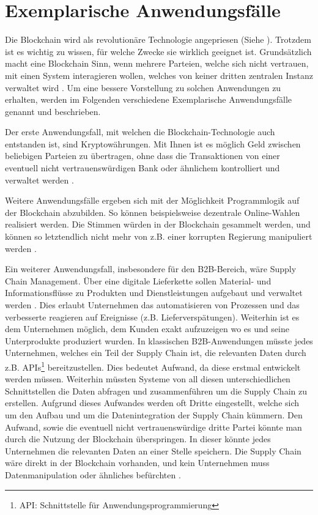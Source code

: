 \section{Exemplarische Anwendungsfälle}
\label{subsec:use-cases}
Die Blockchain wird als revolutionäre Technologie angepriesen (Siehe \cite{TapscottBlockchainRevolutionWieTechnologie2016}). Trotzdem ist es wichtig zu wissen, für welche Zwecke sie wirklich geeignet ist. Grundsätzlich macht eine Blockchain Sinn, wenn mehrere Parteien, welche sich nicht vertrauen, mit einen System interagieren wollen, welches von keiner dritten zentralen Instanz verwaltet wird \cite{WustyouneedBlockchain2017}. Um eine bessere Vorstellung zu solchen Anwendungen zu erhalten, werden im Folgenden verschiedene Exemplarische Anwendungsfälle genannt und beschrieben.

Der erste Anwendungsfall, mit welchen die Blockchain-Technologie auch entstanden ist, sind Kryptowährungen. Mit Ihnen ist es möglich Geld zwischen beliebigen Parteien zu übertragen, ohne dass die Transaktionen von einer eventuell nicht vertrauenswürdigen Bank oder ähnlichem kontrolliert und verwaltet werden \cite{SwanBlockchainblueprintnew2015}.

Weitere Anwendungsfälle ergeben sich mit der Möglichkeit Programmlogik auf der Blockchain abzubilden. So können beispielsweise dezentrale Online-Wahlen realisiert werden. Die Stimmen würden in der Blockchain gesammelt werden, und können so letztendlich nicht mehr von z.B. einer korrupten Regierung manipuliert werden \cite{CastorEthereumVotingScheme2017}. 

Ein weiterer Anwendungsfall, insbesondere für den B2B-Bereich, wäre Supply Chain Management. Über eine digitale Lieferkette sollen Material- und Informationsflüsse zu Produkten und Dienstleistungen aufgebaut und verwaltet werden \cite{KriegerSupplyChainManagement}. Dies erlaubt Unternehmen das automatisieren von Prozessen und das verbesserte reagieren auf Ereignisse (z.B. Lieferverspätungen). Weiterhin ist es dem Unternehmen möglich, dem Kunden exakt aufzuzeigen wo es und seine Unterprodukte produziert wurden. In klassischen B2B-Anwendungen müsste jedes Unternehmen, welches ein Teil der Supply Chain ist, die relevanten Daten durch z.B. APIs\footnote{API: Schnittstelle für Anwendungsprogrammierung\cite{DigHowAPIsevolve2006}} bereitzustellen. Dies bedeutet Aufwand, da diese erstmal entwickelt werden müssen. Weiterhin müssten Systeme von all diesen unterschiedlichen Schnittstellen die Daten abfragen und zusammenführen um die Supply Chain zu erstellen. Aufgrund dieses Aufwandes werden oft Dritte eingestellt, welche sich um den Aufbau und um die Datenintegration der Supply Chain kümmern. Den Aufwand, sowie die eventuell nicht vertrauenswürdige dritte Partei könnte man durch die Nutzung der Blockchain überspringen. In dieser könnte jedes Unternehmen die relevanten Daten an einer Stelle speichern. Die Supply Chain wäre direkt in der Blockchain vorhanden, und kein Unternehmen muss Datenmanipulation oder ähnliches befürchten \cite{KorpelaDigitalSupplyChain2017}.


